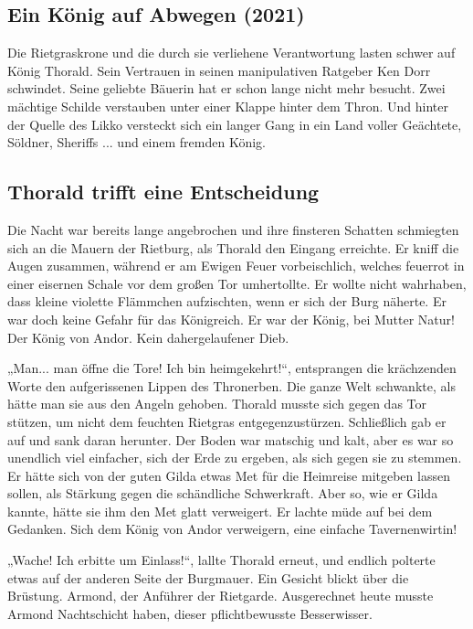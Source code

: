 \begin{chapterbox}
    \chapter{Ein König auf Abwegen (2021)}
    \label{Ein König auf Abwegen (2021)}
    Die Rietgraskrone und die durch sie verliehene Verantwortung lasten schwer auf König Thorald. Sein Vertrauen in seinen manipulativen Ratgeber Ken Dorr schwindet. Seine geliebte Bäuerin hat er schon lange nicht mehr besucht. Zwei mächtige Schilde verstauben unter einer Klappe hinter dem Thron. Und hinter der Quelle des Likko versteckt sich ein langer Gang in ein Land voller Geächtete, Söldner, Sheriffs ... und einem fremden König.
\end{chapterbox}



\section{Thorald trifft eine Entscheidung}


Die Nacht war bereits lange angebrochen und ihre finsteren Schatten schmiegten sich an die Mauern der Rietburg, als Thorald den Eingang erreichte. Er kniff die Augen zusammen, während er am Ewigen Feuer vorbeischlich, welches feuerrot in einer eisernen Schale vor dem großen Tor umhertollte. Er wollte nicht wahrhaben, dass kleine violette Flämmchen aufzischten, wenn er sich der Burg näherte. Er war doch keine Gefahr für das Königreich. Er war der König, bei Mutter Natur! Der König von Andor. Kein dahergelaufener Dieb.

„Man... man öffne die Tore! Ich bin heimgekehrt!“, entsprangen die krächzenden Worte den aufgerissenen Lippen des Thronerben. Die ganze Welt schwankte, als hätte man sie aus den Angeln gehoben. Thorald musste sich gegen das Tor stützen, um nicht dem feuchten Rietgras entgegenzustürzen. Schließlich gab er auf und sank daran herunter. Der Boden war matschig und kalt, aber es war so unendlich viel einfacher, sich der Erde zu ergeben, als sich gegen sie zu stemmen. Er hätte sich von der guten Gilda etwas Met für die Heimreise mitgeben lassen sollen, als Stärkung gegen die schändliche Schwerkraft. Aber so, wie er Gilda kannte, hätte sie ihm den Met glatt verweigert. Er lachte müde auf bei dem Gedanken. Sich dem König von Andor verweigern, eine einfache Tavernenwirtin!

„Wache! Ich erbitte um Einlass!“, lallte Thorald erneut, und endlich polterte etwas auf der anderen Seite der Burgmauer. Ein Gesicht blickt über die Brüstung. Armond, der Anführer der Rietgarde. Ausgerechnet heute musste Armond Nachtschicht haben, dieser pflichtbewusste Besserwisser.

